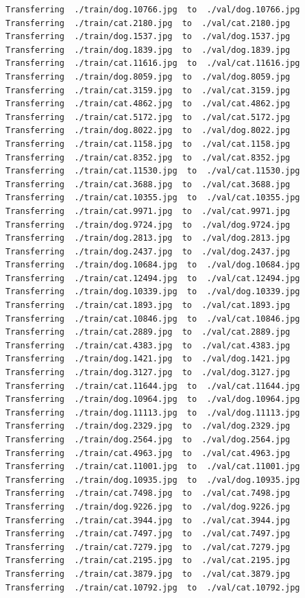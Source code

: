 \documentclass[]{book}
\theoremstyle{definition}
\theoremstyle{definition}
\theoremstyle{definition}
\theoremstyle{remark}
\begin{document}
\begin{verbatim}
Transferring  ./train/dog.10766.jpg  to  ./val/dog.10766.jpg
Transferring  ./train/cat.2180.jpg  to  ./val/cat.2180.jpg
Transferring  ./train/dog.1537.jpg  to  ./val/dog.1537.jpg
Transferring  ./train/dog.1839.jpg  to  ./val/dog.1839.jpg
Transferring  ./train/cat.11616.jpg  to  ./val/cat.11616.jpg
Transferring  ./train/dog.8059.jpg  to  ./val/dog.8059.jpg
Transferring  ./train/cat.3159.jpg  to  ./val/cat.3159.jpg
Transferring  ./train/cat.4862.jpg  to  ./val/cat.4862.jpg
Transferring  ./train/cat.5172.jpg  to  ./val/cat.5172.jpg
Transferring  ./train/dog.8022.jpg  to  ./val/dog.8022.jpg
Transferring  ./train/cat.1158.jpg  to  ./val/cat.1158.jpg
Transferring  ./train/cat.8352.jpg  to  ./val/cat.8352.jpg
Transferring  ./train/cat.11530.jpg  to  ./val/cat.11530.jpg
Transferring  ./train/cat.3688.jpg  to  ./val/cat.3688.jpg
Transferring  ./train/cat.10355.jpg  to  ./val/cat.10355.jpg
Transferring  ./train/cat.9971.jpg  to  ./val/cat.9971.jpg
Transferring  ./train/dog.9724.jpg  to  ./val/dog.9724.jpg
Transferring  ./train/dog.2813.jpg  to  ./val/dog.2813.jpg
Transferring  ./train/dog.2437.jpg  to  ./val/dog.2437.jpg
Transferring  ./train/dog.10684.jpg  to  ./val/dog.10684.jpg
Transferring  ./train/cat.12494.jpg  to  ./val/cat.12494.jpg
Transferring  ./train/dog.10339.jpg  to  ./val/dog.10339.jpg
Transferring  ./train/cat.1893.jpg  to  ./val/cat.1893.jpg
Transferring  ./train/cat.10846.jpg  to  ./val/cat.10846.jpg
Transferring  ./train/cat.2889.jpg  to  ./val/cat.2889.jpg
Transferring  ./train/cat.4383.jpg  to  ./val/cat.4383.jpg
Transferring  ./train/dog.1421.jpg  to  ./val/dog.1421.jpg
Transferring  ./train/dog.3127.jpg  to  ./val/dog.3127.jpg
Transferring  ./train/cat.11644.jpg  to  ./val/cat.11644.jpg
Transferring  ./train/dog.10964.jpg  to  ./val/dog.10964.jpg
Transferring  ./train/dog.11113.jpg  to  ./val/dog.11113.jpg
Transferring  ./train/dog.2329.jpg  to  ./val/dog.2329.jpg
Transferring  ./train/dog.2564.jpg  to  ./val/dog.2564.jpg
Transferring  ./train/cat.4963.jpg  to  ./val/cat.4963.jpg
Transferring  ./train/cat.11001.jpg  to  ./val/cat.11001.jpg
Transferring  ./train/dog.10935.jpg  to  ./val/dog.10935.jpg
Transferring  ./train/cat.7498.jpg  to  ./val/cat.7498.jpg
Transferring  ./train/dog.9226.jpg  to  ./val/dog.9226.jpg
Transferring  ./train/cat.3944.jpg  to  ./val/cat.3944.jpg
Transferring  ./train/cat.7497.jpg  to  ./val/cat.7497.jpg
Transferring  ./train/cat.7279.jpg  to  ./val/cat.7279.jpg
Transferring  ./train/cat.2195.jpg  to  ./val/cat.2195.jpg
Transferring  ./train/cat.3879.jpg  to  ./val/cat.3879.jpg
Transferring  ./train/cat.10792.jpg  to  ./val/cat.10792.jpg

\end{verbatim}
\end{document}
